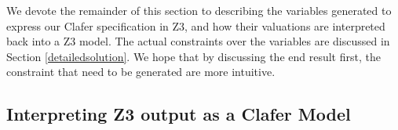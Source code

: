 \documentclass{easychair}
\begin{document}
\indent We devote the remainder of this section to describing the variables generated to express our Clafer specification in Z3, and how their valuations are interpreted back into a Z3 model. The actual constraints over the variables are discussed in Section \ref{detailedsolution}. We hope that by discussing the end result first, the constraint that need to be generated are more intuitive.
\subsection{Interpreting Z3 output as a Clafer Model}




\end{document}
